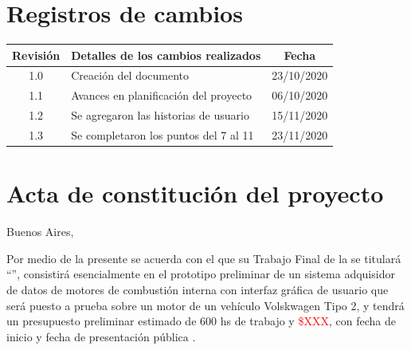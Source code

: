 \documentclass[11pt]{charter}
\begin{document}
\maketitle
\thispagestyle{empty}
\pagebreak


\thispagestyle{empty}
{\setlength{\parskip}{0pt}
\tableofcontents{}
}
\pagebreak


\section{Registros de cambios}
\label{sec:registro}


\begin{table}[ht]
\label{tab:registro}
\centering
\begin{tabularx}{\linewidth}{@{}|c|X|c|@{}}
\hline
\rowcolor[HTML]{C0C0C0} 
Revisión & \multicolumn{1}{c|}{\cellcolor[HTML]{C0C0C0}Detalles de los cambios realizados} & Fecha      \\ \hline
1.0      & Creación del documento                                          & 23/10/2020 \\ \hline
1.1      & Avances en planificación del proyecto                           & 06/10/2020 \\ \hline
1.2      & Se agregaron las historias de usuario							 & 15/11/2020 \\ \hline
1.3      & Se completaron los puntos del 7 al 11							 & 23/11/2020 \\ \hline
\end{tabularx}
\end{table}

\pagebreak



\section{Acta de constitución del proyecto}
\label{sec:acta}

\begin{flushright}
Buenos Aires, \fechaInicioName
\end{flushright}

\vspace{2cm}

Por medio de la presente se acuerda con el \authorname\hspace{1px} que su Trabajo Final de la \degreename\hspace{1px} se titulará ``\ttitle'', consistirá esencialmente en el prototipo preliminar de un sistema adquisidor de datos de motores de combustión interna con interfaz gráfica de usuario que será puesto a prueba sobre un motor de un vehículo Volskwagen Tipo 2, y tendrá un presupuesto preliminar estimado de 600 hs de trabajo y \textcolor{red}{\$XXX}, con fecha de inicio \fechaInicioName\hspace{1px} y fecha de presentación pública \fechaFinalName.
\end{document}
